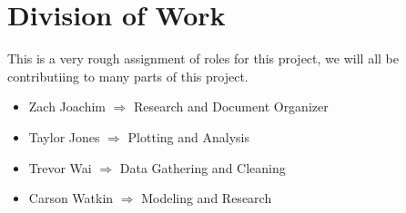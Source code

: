\documentclass[12pt]{article}
\begin{document}
\section{Division of Work}

This is a very rough assignment of roles for this project, we will all be contributiing to many parts of this 
project. 
\begin{itemize}
    \item Zach Joachim $\Rightarrow$ Research and Document Organizer
    \item Taylor Jones $\Rightarrow$ Plotting and Analysis
    \item Trevor Wai $\Rightarrow$ Data Gathering and Cleaning
    \item Carson Watkin $\Rightarrow$ Modeling and Research
\end{itemize}
\end{document}
